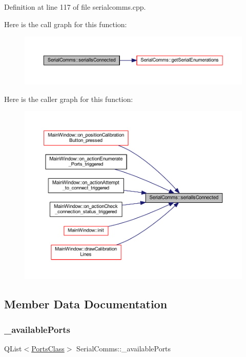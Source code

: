 Definition at line 117 of file serialcomms.\+cpp.

Here is the call graph for this function\+:
\nopagebreak
\begin{figure}[H]
\begin{center}
\leavevmode
\includegraphics[width=350pt]{class_serial_comms_ad9980837a7d0672d100b0b83e3e47451_cgraph}
\end{center}
\end{figure}
Here is the caller graph for this function\+:
\nopagebreak
\begin{figure}[H]
\begin{center}
\leavevmode
\includegraphics[width=350pt]{class_serial_comms_ad9980837a7d0672d100b0b83e3e47451_icgraph}
\end{center}
\end{figure}


\subsection{Member Data Documentation}
\mbox{\label{class_serial_comms_aed2175e6fe3d3c62e8f0b12333c7b650}} 
\subsubsection{\texorpdfstring{\_availablePorts}{\_availablePorts}}
{\footnotesize\ttfamily Q\+List$<$\mbox{\hyperlink{class_ports_class}{Ports\+Class}}$>$ Serial\+Comms\+::\+\_\+available\+Ports\hspace{0.3cm}{\ttfamily [private]}}



